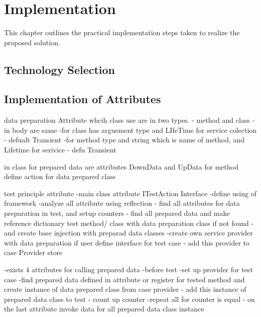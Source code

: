 
\chapter{ Implementation\label{chap:framework_implementation}}
This chapter outlines the practical implementation steps taken to realize the proposed solution.


\todo{}

\section{Technology Selection}

\todo{}

\section{Implementation of Attributes}

data preparation
Attribute whcih class use are in two types.
 - method and class
 - in body are same
 -for class has arguement type and LIfeTime for service colection - defualt Transient
 -for method type and string which is name of method, and Lifetime for serivice - defu Transient

in class for prepared data are attributes
    DownData and UpData for method
    define action for data prepared class
    


test principle attribute
-main class attribute ITestAction Interface
    -define using of framework
    -analyze all attribute using reflection
     - find all attributes for data preparation in test, and setup counters
     -  find all prepared data and make reference  dictionary test method/ class with data preparation
    class if not found
    -and create base injection with preparad data classes  
    -create own service provider with data preparation if user define interface for test case
    - add this provider to case Provider store
   

-exists 4 attributes for calling prepared data
    -before test
        -set up provider for test case
        -find prepared data defined in attribute or register for tested method and create instance of data prepared class from case provider
        - add this instance of prepared data class to test
        - count up counter
        -repeat all for counter is equal 
        - on the last attribute invoke data for  all prepared data class instance

